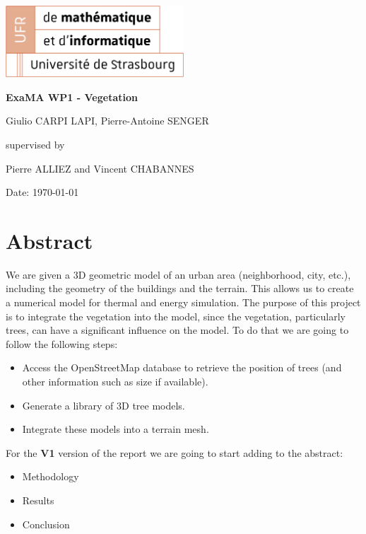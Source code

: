 \documentclass[12pt]{article}
\begin{document}
\begin{titlepage}
    \centering
    \includegraphics[width=0.5\textwidth]{images/logo_ufr.png}\par\vspace{1cm}
    \vspace{1.5cm}
    {\huge\bfseries ExaMA WP1 - Vegetation\par}
    \vspace{2cm}
    {\Large Giulio CARPI LAPI, Pierre-Antoine SENGER\par}
    \vfill
    supervised by\par
    Pierre ALLIEZ and Vincent CHABANNES

    \vfill

    {\large Date: \today\par}
\end{titlepage}

\tableofcontents
\newpage

\section{Abstract}
We are given a 3D geometric model of an urban area (neighborhood, city, etc.),
including the geometry of the buildings and the terrain.
This allows us to create a numerical model for thermal and energy simulation.
The purpose of this project is to integrate the vegetation into the model,
since the vegetation, particularly trees,
can have a significant influence on the model.
To do that we are going to follow the following steps:

\begin{itemize}
    \item Access the OpenStreetMap database to retrieve the position of trees
    (and other information such as size if available).
    \item Generate a library of 3D tree models.
    \item Integrate these models into a terrain mesh.
\end{itemize}

For the \textbf{V1} version of the report we are going to start adding
to the abstract:

\begin{itemize}
    \item Methodology
    \item Results
    \item Conclusion
\end{itemize}
\end{document}
